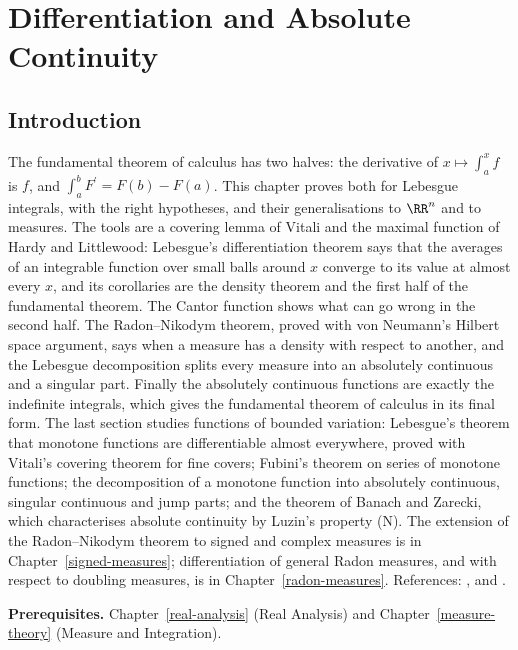\chapter{Differentiation and Absolute Continuity}\label{lebesgue-differentiation}

\section{Introduction}\label{lebesgue-differentiation:section-introduction}

The fundamental theorem of calculus has two halves: the derivative of $x \mapsto \int_a^xf$ is $f$, and $\int_a^bF^{\prime} = F(b) - F(a)$. This chapter proves both for Lebesgue integrals, with the right
hypotheses, and their generalisations to $\RR^n$ and to measures. The tools are a covering lemma of Vitali and the maximal function of Hardy and Littlewood: Lebesgue's differentiation theorem says that
the averages of an integrable function over small balls around $x$ converge to its value at almost every $x$, and its corollaries are the density theorem and the first half of the fundamental theorem.
The Cantor function shows what can go wrong in the second half. The Radon--Nikodym theorem, proved with von Neumann's Hilbert space argument, says when a measure has a density with respect to another,
and the Lebesgue decomposition splits every measure into an absolutely continuous and a singular part. Finally the absolutely continuous functions are exactly the indefinite integrals, which gives the
fundamental theorem of calculus in its final form. The last section studies functions of bounded variation: Lebesgue's theorem that monotone
functions are differentiable almost everywhere, proved with Vitali's covering theorem for fine covers; Fubini's theorem on series of monotone functions; the decomposition of a monotone
function into absolutely continuous, singular continuous and jump parts; and the theorem of Banach and Zarecki, which characterises absolute continuity by Luzin's property (N). The extension of the Radon--Nikodym theorem to signed and complex measures is in Chapter~\ref{signed-measures}; differentiation of general
Radon measures, and with respect to doubling measures, is in Chapter~\ref{radon-measures}.
References: \cite{folland-real}, \cite{rudin-rca} and \cite{stein-shakarchi-real}.

\noindent\textbf{Prerequisites.} Chapter~\ref{real-analysis} (Real Analysis) and Chapter~\ref{measure-theory} (Measure and Integration).

